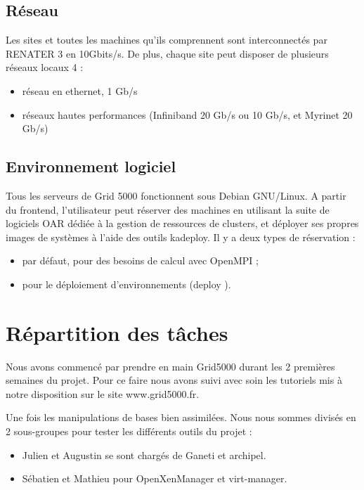  \subsection{Réseau}
Les sites et toutes les machines qu'ils comprennent sont interconnectés par RENATER 3 en 10Gbits/s. De
plus, chaque site peut disposer de plusieurs réseaux locaux 4 :
\begin{itemize}
\item réseau en ethernet, 1 Gb/s
\item réseaux hautes performances (Infiniband 20 Gb/s ou 10 Gb/s, et Myrinet 20 Gb/s)
\end{itemize}

  \subsection{Environnement logiciel}
Tous les serveurs de Grid 5000 fonctionnent sous Debian GNU/Linux.
A partir du frontend, l'utilisateur peut réserver des machines en utilisant la suite de logiciels OAR dédiée à
la gestion de ressources de clusters, et déployer ses propres images de systèmes à l'aide des outils kadeploy.
Il y a deux types de réservation :
\begin{itemize}
\item par défaut, pour des besoins de calcul avec OpenMPI ;
\item pour le déploiement d'environnements (deploy ).
\end{itemize}


\section{Répartition des tâches}
Nous avons commencé par prendre en main Grid5000 durant les 2 premières semaines du projet. Pour ce faire nous avons suivi avec soin les tutoriels mis à notre disposition sur le site www.grid5000.fr.

Une fois les manipulations de bases bien assimilées. Nous nous sommes divisés en 2 sous-groupes pour tester les différents outils du projet :
\begin{itemize}
  \item Julien et Augustin se sont chargés de Ganeti et archipel.
  \item Sébatien et Mathieu pour OpenXenManager et virt-manager.
\end{itemize}

